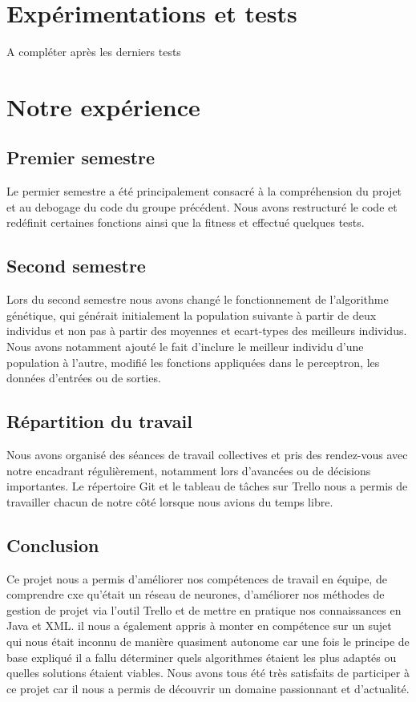\documentclass[12pt]{article}
\begin{document}
\newpage

\section{Expérimentations et tests}
A compléter après les derniers tests

\newpage

\section{Notre expérience}

\subsection{Premier semestre}
Le permier semestre a été principalement consacré à la compréhension du projet et au debogage du code du groupe précédent. Nous avons restructuré le code et redéfinit certaines fonctions ainsi que la fitness et effectué quelques tests.

\subsection{Second semestre}
Lors du second semestre nous avons changé le fonctionnement de l'algorithme génétique, qui générait initialement la population suivante à partir de deux individus et non pas à partir des moyennes et ecart-types des meilleurs individus. Nous avons notamment ajouté le fait d'inclure le meilleur individu d'une population à l'autre, modifié les fonctions appliquées dans le perceptron, les données d'entrées ou de sorties.

\subsection{Répartition du travail}
Nous avons organisé des séances de travail collectives et pris des rendez-vous avec notre encadrant régulièrement, notamment lors d'avancées ou de décisions importantes. Le répertoire Git et le tableau de tâches sur Trello nous a permis de travailler chacun de notre côté lorsque nous avions du temps libre.

\subsection{Conclusion}
Ce projet nous a permis d'améliorer nos compétences de travail en équipe, de comprendre cxe qu'était un réseau de neurones, d'améliorer nos méthodes de gestion de projet via l'outil Trello et de mettre en pratique nos connaissances en Java et XML. il nous a également appris à monter en compétence sur un sujet qui nous était inconnu de manière quasiment autonome car une fois le principe de base expliqué il a fallu déterminer quels algorithmes étaient les plus adaptés ou quelles solutions étaient viables.
Nous avons tous été très satisfaits de participer à ce projet car il nous a permis de découvrir un domaine passionnant et d'actualité.
\end{document}
